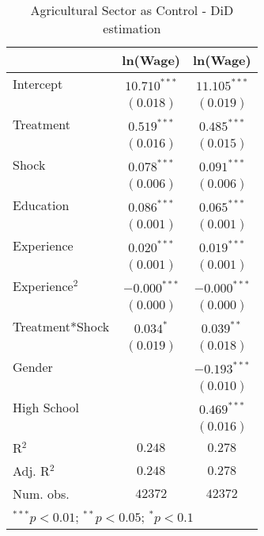 
\begin{table}[H]
\caption{Agricultural Sector as Control - DiD estimation}
\begin{center}
\begin{tabular}{l c c}
\hline
 & ln(Wage) & ln(Wage) \\
\hline
Intercept       & $10.710^{***}$ & $11.105^{***}$ \\
                & $(0.018)$      & $(0.019)$      \\
Treatment       & $0.519^{***}$  & $0.485^{***}$  \\
                & $(0.016)$      & $(0.015)$      \\
Shock           & $0.078^{***}$  & $0.091^{***}$  \\
                & $(0.006)$      & $(0.006)$      \\
Education       & $0.086^{***}$  & $0.065^{***}$  \\
                & $(0.001)$      & $(0.001)$      \\
Experience      & $0.020^{***}$  & $0.019^{***}$  \\
                & $(0.001)$      & $(0.001)$      \\
Experience$^2$  & $-0.000^{***}$ & $-0.000^{***}$ \\
                & $(0.000)$      & $(0.000)$      \\
Treatment*Shock & $0.034^{*}$    & $0.039^{**}$   \\
                & $(0.019)$      & $(0.018)$      \\
Gender          &                & $-0.193^{***}$ \\
                &                & $(0.010)$      \\
High School     &                & $0.469^{***}$  \\
                &                & $(0.016)$      \\
\hline
R$^2$           & $0.248$        & $0.278$        \\
Adj. R$^2$      & $0.248$        & $0.278$        \\
Num. obs.       & $42372$        & $42372$        \\
\hline
\multicolumn{3}{l}{\scriptsize{$^{***}p<0.01$; $^{**}p<0.05$; $^{*}p<0.1$}}
\end{tabular}
\label{table:coefficients}
\end{center}
\end{table}
